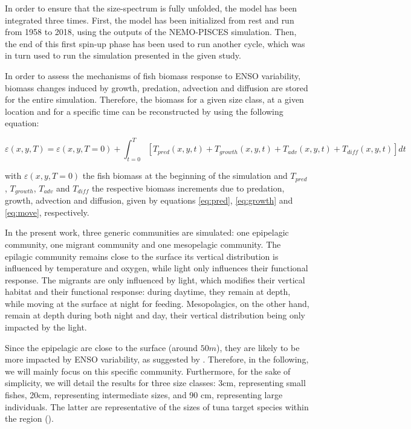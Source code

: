 In order to ensure that the size-spectrum is fully unfolded, the model has been integrated three times. First, the model has been initialized from rest and run from 1958 to 2018, using the outputs of the NEMO-PISCES simulation. Then, the end of this first spin-up phase has been used to run another cycle, which was in turn used to run the simulation presented in the given study.

In order to assess the mechanisms of fish biomass response to ENSO variability, biomass changes induced by growth, predation, advection and diffusion are stored for the entire simulation. Therefore, the biomass for a given size class, at a given location and for a specific time can be reconstructed by using the following equation:

\begin{equation}
\varepsilon(x,y,T) = \varepsilon(x,y,T=0) + \int_{t=0}^{T} \left[ 
T_{pred}(x, y,t) + 
T_{growth}(x, y,t) + 
T_{adv}(x, y,t) + 
T_{diff}(x, y,t) 
\right] dt 
\label{eq:rec_oope}
\end{equation}

with $\varepsilon(x,y,T=0)$ the fish biomass at the beginning of the simulation and $T_{pred}$, $T_{growth}$, $T_{adv}$ and $T_{diff}$ the respective biomass increments due to predation, growth, advection and diffusion, given by equations \ref{eq:pred}, \ref{eq:growth} and \ref{eq:move}, respectively.

In the present work, three generic communities are simulated: one epipelagic community, one migrant community and one mesopelagic community. The epilagic community remains close to the surface its vertical distribution is influenced by temperature and oxygen, while light only influences their functional response. The migrants are only influenced by light, which modifies their vertical habitat and their functional response: during daytime, they remain at depth, while moving at the surface at night for feeding. Mesopolagics, on the other hand, remain at depth during both night and day, their vertical distribution being only impacted by the light. 

Since the epipelagic are close to the surface (around $50m$), they are likely to be more impacted by ENSO variability, as suggested by \cite{lemezoNaturalVariabilityMarine2016}. Therefore, in the following, we will mainly focus on this specific community. Furthermore, for the sake of simplicity, we will detail the results for three size classes: 3cm, representing small fishes, 20cm, representing intermediate sizes, and 90 cm, representing large individuals. The latter are representative of the sizes of tuna target species within the region (). \\

